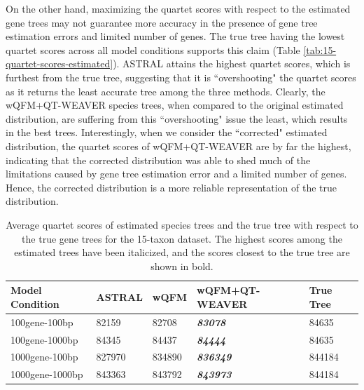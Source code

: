 \documentclass[10pt,a4paper]{article}
\begin{document}
On the other hand, maximizing the quartet scores with respect to the estimated gene trees may not guarantee more accuracy in the presence of gene tree estimation errors and limited number of genes. The true tree having the lowest quartet scores across all model conditions supports this claim (Table \ref{tab:15-quartet-scores-estimated}). ASTRAL attains the highest quartet scores, which is furthest from the true tree, suggesting that it is ``overshooting" the quartet scores as it returns the least accurate tree among the three methods. Clearly, the wQFM+QT-WEAVER species trees, when compared to the original estimated distribution, are suffering from this ``overshooting" issue the least, which results in the best trees. Interestingly, when we consider the ``corrected" estimated distribution, the quartet scores of wQFM+QT-WEAVER are by far the highest, indicating that the corrected distribution was able to shed much of the limitations caused by gene tree estimation error and a limited number of genes. Hence, the corrected distribution is a more reliable representation of the true distribution.

\begin{table}[h!]
    \centering
    \caption{Average quartet scores of estimated species trees and the true tree with respect to the true gene trees for the 15-taxon dataset. The highest scores among the estimated trees have been italicized, and the scores closest to the true tree are shown in bold.}
    \label{tab:15-quartet-scores-true}
    \begin{tabular}{|C{2.3cm}|C{3cm}|C{3cm}|C{3cm}|C{3cm}|}
        \hline
        \textbf{Model Condition} & \textbf{ASTRAL} & \textbf{wQFM} & \textbf{wQFM+QT-WEAVER} & \textbf{True  Tree} \\
        \hline \hline
        100gene-100bp & 82159 & 82708 & \textbf{\textit{83078}} & 84635 \\
        \hline
        100gene-1000bp & 84345 & 84437 & \textbf{\textit{84444}} & 84635 \\
        \hline
        1000gene-100bp & 827970 & 834890 & \textbf{\textit{836349}} & 844184 \\
        \hline
        1000gene-1000bp & 843363 & 843792 & \textbf{\textit{843973}} & 844184 \\
        \hline
    \end{tabular}
\end{table}
\end{document}
